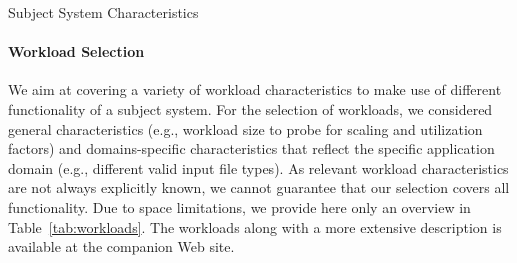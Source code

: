 \begin{table}[h]
	\footnotesize
	\centering
	\caption{Subject System Characteristics}
	
	\label{tab:subject_systems}
\end{table}

\paragraph{Workload Selection}
We aim at covering a variety of workload characteristics to make use of different functionality of a subject system. For the selection of workloads, we considered general characteristics (e.g., workload size to probe for scaling and utilization factors) and domains-specific characteristics that reflect the specific application domain (e.g., different valid input file types). {\color{green!52!black}As relevant workload characteristics are not always explicitly known, we cannot guarantee that our selection covers all functionality.}
Due to space limitations, we provide here only an overview in Table~\ref{tab:workloads}. The workloads along with a more extensive description is available at the companion Web site. 


